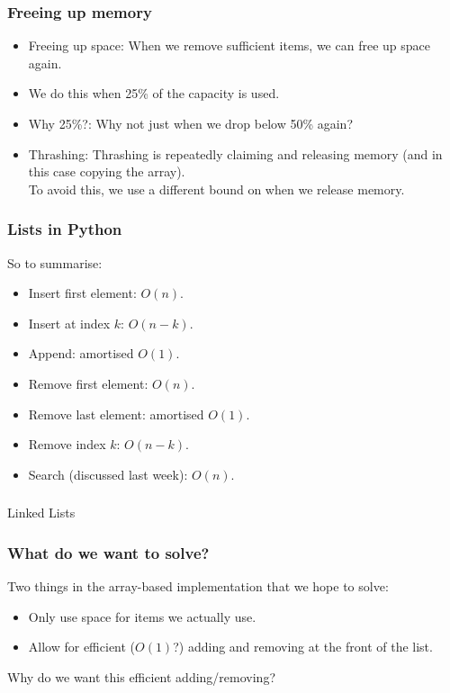 \begin{frame}
	\frametitle{Freeing up memory}
	\begin{itemize}
		\item Freeing up space: When we remove sufficient items, we can free up space again.
		\item We do this when 25\% of the capacity is used.
	
		\item Why 25\%?:	Why not just when we drop below 50\% again?
		\item Thrashing:
		Thrashing is repeatedly claiming and releasing memory (and in this case copying the array).\\
		To avoid this, we use a different bound on when we release memory.
	\end{itemize}
\end{frame}

\begin{frame}
	\frametitle{Lists in Python}
	So to summarise:
	\begin{itemize}
		\item Insert first element: $O(n)$.
		\item Insert at index $k$: $O(n-k)$.
		\item Append: amortised $O(1)$.
		\item Remove first element: $O(n)$.
		\item Remove last element: amortised $O(1)$.
		\item Remove index $k$: $O(n-k)$.
		\item Search (discussed last week): $O(n)$.
	\end{itemize}
\end{frame}

\begin{frame}[fragile]\frametitle{}
\begin{center}
{\Large Linked Lists}
\end{center}

\end{frame}

\begin{frame}
	\frametitle{What do we want to solve?}
	
		Two things in the array-based implementation that we hope to solve:
		\begin{itemize}
			\item Only use space for items we actually use.
			\item Allow for efficient ($O(1)$?) adding and removing at the front of the list.
		\end{itemize}
	
		Why do we want this efficient adding/removing?
\end{frame}

